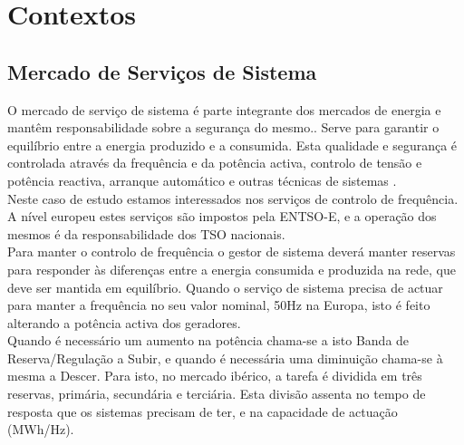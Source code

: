 \chapter{Contextos\label{ch:contextos}}

\section{Mercado de Serviços de Sistema \label{se:servicos_sistema}}

O mercado de serviço de sistema é parte integrante dos mercados de energia e mantêm responsabilidade sobre a segurança do mesmo.\cite{dgegmss}.
Serve para garantir o equilíbrio entre a energia produzido e a consumida. Esta qualidade e segurança é controlada através da frequência e da potência activa, controlo de tensão e potência reactiva, arranque automático e outras técnicas de sistemas \cite{Rassid2017} \cite{Carneiro2016}. \\
Neste caso de estudo estamos interessados nos serviços de controlo de frequência. A nível europeu estes serviços são impostos pela \gls{ENTSO-E}, e a operação dos mesmos é da responsabilidade dos \gls{TSO} nacionais.\\
Para manter o controlo de frequência o gestor de sistema deverá manter reservas para responder às diferenças entre a energia consumida e produzida na rede, que deve ser mantida em equilíbrio. Quando o serviço de sistema precisa de actuar para manter a frequência no seu valor nominal, 50Hz na Europa, isto é feito alterando a potência activa dos geradores.  \\
Quando é necessário um aumento na potência chama-se a isto Banda de Reserva/Regulação a Subir, e quando é necessária uma diminuição chama-se à mesma a Descer.
Para isto, no mercado ibérico, a tarefa é dividida em três reservas, primária, secundária e terciária. Esta divisão assenta no tempo de resposta que os sistemas precisam de ter, e na capacidade de actuação (MWh/Hz). \\

